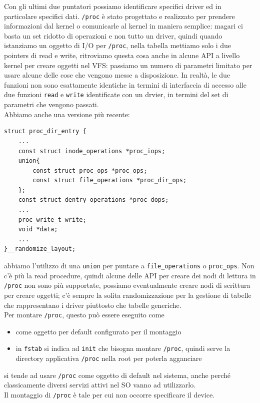 \documentclass[12pt, oneside]{extbook}
\begin{document}
Con gli ultimi due puntatori possiamo identificare specifici driver ed in particolare specifici dati. \texttt{/proc} è stato progettato e realizzato per prendere informazioni dal kernel o comunicarle al kernel in maniera semplice: magari ci basta un set ridotto di operazioni e non tutto un driver, quindi quando istanziamo un oggetto di I/O per \texttt{/proc}, nella tabella mettiamo solo i due pointers di read e write, ritroviamo questa cosa anche in alcune API a livello kernel per creare oggetti nel VFS: passiamo un numero di parametri limitato per usare alcune delle cose che vengono messe a disposizione. In realtà, le due funzioni non sono esattamente identiche in termini di interfaccia di accesso alle due funzioni \texttt{read} e \texttt{write} identificate con un drvier, in termini del set di parametri che vengono passati.\\Abbiamo anche una versione più recente:
\begin{lstlisting}
struct proc_dir_entry {
	...
	const struct inode_operations *proc_iops;
	union{
		const struct proc_ops *proc_ops;
		const struct file_operations *proc_dir_ops;
	};
	const struct dentry_operations *proc_dops;
	...
	proc_write_t write;
	void *data;
	...
}__randomize_layout;
\end{lstlisting}
abbiamo l'utilizzo di una \texttt{union} per puntare a \texttt{file\_operations} o \texttt{proc\_ops}. Non c'è più la read procedure, quindi alcune delle API per creare dei nodi di lettura in \texttt{/proc} non sono più supportate, possiamo eventualmente creare nodi di scrittura per creare oggetti; c'è sempre la solita randomizzazione per la gestione di tabelle che rappresentano i driver piuttosto che tabelle generiche.\\Per montare \texttt{/proc}, questo può essere eseguito come
\begin{itemize}
	\item come oggetto per default configurato per il montaggio
	\item in \texttt{fstab} si indica ad \texttt{init} che bisogna montare \texttt{/proc}, quindi serve la directory applicativa \texttt{/proc} nella root per poterla agganciare
\end{itemize}
si tende ad usare \texttt{/proc} come oggetto di default nel sistema, anche perché classicamente diversi servizi attivi nel SO vanno ad utilizzarlo.\\Il montaggio di \texttt{/proc} è tale per cui non occorre specificare il device.
\end{document}
